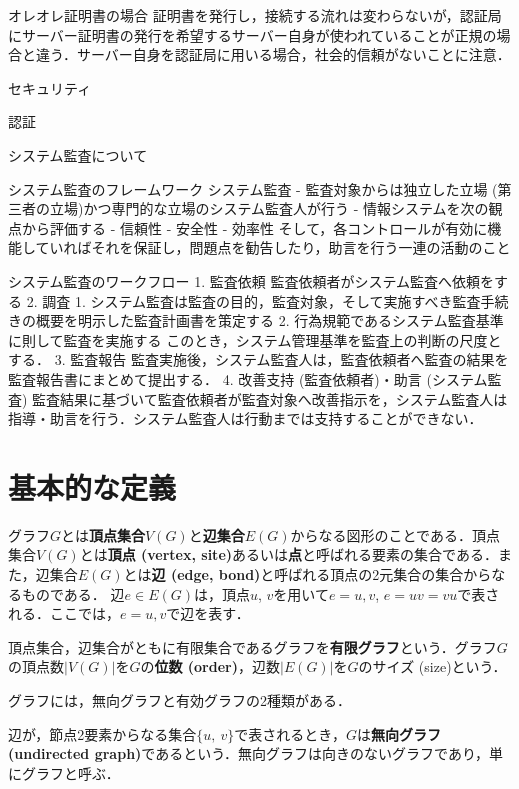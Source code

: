  オレオレ証明書の場合
証明書を発行し，接続する流れは変わらないが，認証局にサーバー証明書の発行を希望するサーバー自身が使われていることが正規の場合と違う．サーバー自身を認証局に用いる場合，社会的信頼がないことに注意．

 セキュリティ

 認証


 システム監査について

 システム監査のフレームワーク
システム監査
- 監査対象からは独立した立場 (第三者の立場)かつ専門的な立場のシステム監査人が行う
- 情報システムを次の観点から評価する
- 信頼性
- 安全性
- 効率性
そして，各コントロールが有効に機能していればそれを保証し，問題点を勧告したり，助言を行う一連の活動のこと

 システム監査のワークフロー
1. 監査依頼
監査依頼者がシステム監査へ依頼をする 
2. 調査
    1. システム監査は監査の目的，監査対象，そして実施すべき監査手続きの概要を明示した監査計画書を策定する
    2. 行為規範であるシステム監査基準に則して監査を実施する
    このとき，システム管理基準を監査上の判断の尺度とする．
3. 監査報告
監査実施後，システム監査人は，監査依頼者へ監査の結果を監査報告書にまとめて提出する．
4. 改善支持 (監査依頼者)・助言 (システム監査)
監査結果に基づいて監査依頼者が監査対象へ改善指示を，システム監査人は指導・助言を行う．システム監査人は行動までは支持することができない．


\section{基本的な定義}
\begin{definition}[認証]
グラフ$G$とは\textbf{頂点集合}$V(G)$と\textbf{辺集合}$E(G)$からなる図形のことである．頂点集合$V(G)$とは\textbf{頂点 (vertex, site)}あるいは\textbf{点}と呼ばれる要素の集合である．また，辺集合$E(G)$とは\textbf{辺 (edge, bond)}と呼ばれる頂点の2元集合の集合からなるものである．
辺$e\in E(G)$は，頂点$u$, $v$を用いて$e={u, v}$, $e=uv=vu$で表される．ここでは，$e={u, v}$で辺を表す．

頂点集合，辺集合がともに有限集合であるグラフを\textbf{有限グラフ}という．グラフ$G$の頂点数$|V(G)|$を$G$の\textbf{位数 (order)}，辺数$|E(G)|$を$G$のサイズ (size)という．
\end{definition}
グラフには，無向グラフと有効グラフの2種類がある．
\begin{definition}[無向グラフ]
    辺が，節点2要素からなる集合$\{u,\ v\}$で表されるとき，$G$は\textbf{無向グラフ (undirected graph)}であるという．無向グラフは向きのないグラフであり，単にグラフと呼ぶ．
\end{definition}

